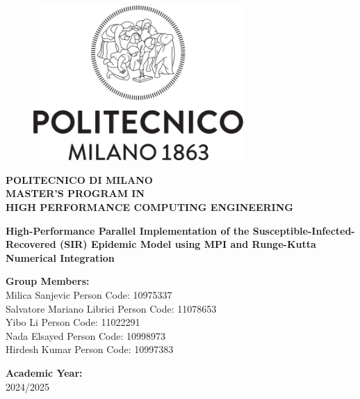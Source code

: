 \begin{titlepage}
\begin{figure}[!htb]
    \centering
    \includegraphics[width=8cm]{Images/Logo_Politecnico_Milano.png}
\end{figure}

\begin{center}
    \LARGE{\textbf{POLITECNICO DI MILANO}} \\[2mm]
    
    \small{\textbf{MASTER'S PROGRAM IN}} \\[1mm]
    
    \small{\textbf{HIGH PERFORMANCE COMPUTING ENGINEERING}} \\[2mm]
\end{center}

\vspace*{\fill}

\begin{center}
    \Large{\textbf{High-Performance Parallel Implementation of the Susceptible-Infected-Recovered (SIR) Epidemic Model using MPI and Runge-Kutta Numerical Integration}}\\
\end{center}

\vspace*{\fill}

\begin{minipage}[t]{1\textwidth}
    \vspace{-10mm}
    {\small \textbf{Group Members:}}\\[2mm]
    {\small
    Milica Sanjevic \hfill Person Code: 10975337\\
    Salvatore Mariano Librici \hfill Person Code: 11078653\\
    Yibo Li \hfill Person Code: 11022291\\
    Nada Elsayed \hfill Person Code: 10998973\\
    Hirdesh Kumar \hfill Person Code: 10997383\\
    }
\end{minipage}



\vspace{10mm}

\begin{center}
    {\small{\textbf{Academic Year:}}{\small\vspace{0.5mm}
    \\ \small{2024/2025}}}  
\end{center}

\end{titlepage}
